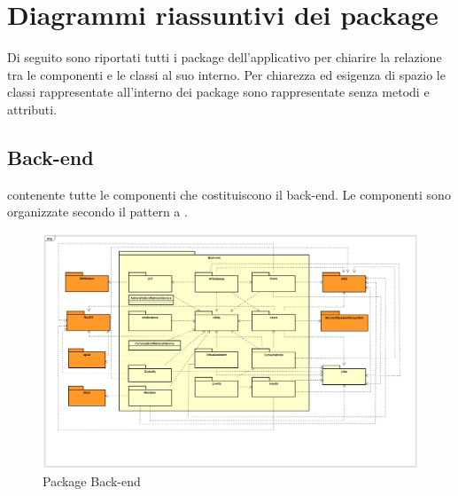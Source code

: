 \section{Diagrammi riassuntivi dei package}
Di seguito sono riportati tutti i package dell’applicativo per chiarire la relazione tra le componenti e le classi al suo interno. Per chiarezza ed esigenza di spazio le classi rappresentate all’interno dei package sono rappresentate senza metodi e attributi.


\subsection{Back-end}
 contenente tutte le componenti che costituiscono il back-end. Le componenti sono organizzate secondo il pattern a .
\begin{figure}[h] \centering \includegraphics[width=\textwidth,height=\textheight,keepaspectratio]{images/diagrams/back-end/Official_Backend_0304/Back-end.png}
	\caption{Package Back-end}
\end{figure}
\newpage

